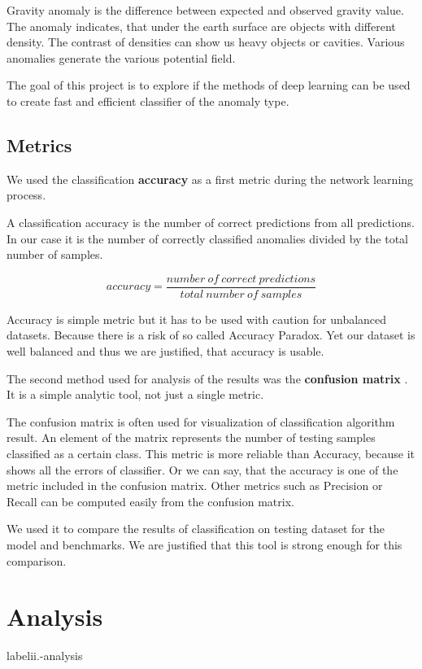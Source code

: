 \documentclass{article}
\begin{document}
Gravity anomaly is the difference between expected and observed gravity
value. The anomaly indicates, that under the earth surface are objects
with different density. The contrast of densities can show us heavy
objects or cavities. Various anomalies generate the various potential
field.

The goal of this project is to explore if the methods of deep learning
can be used to create fast and efficient classifier of the anomaly
type.

\subsection{Metrics}

We used the classification \textbf{accuracy} as a first metric during the network learning process. 

A classification accuracy is the number of correct predictions from all
predictions. In our case it is the number of correctly classified anomalies
divided by the total number of samples.

\begin{equation}
accuracy = \frac{number~of~correct~predictions}{total~number~of~samples}
\end{equation}


Accuracy is simple metric but it has to be used with caution for unbalanced
datasets.  Because there is a risk of so called Accuracy Paradox.  Yet our
dataset is well balanced and thus we are justified, that accuracy is usable.
      

The second method used for analysis of the results was the \textbf{confusion
matrix} \cite{conmat}. It is a simple analytic tool, not just a single metric.

The confusion matrix is often used for visualization of classification algorithm
result. An element of the matrix represents the number of testing samples
classified as a certain class. This metric is  more reliable than Accuracy,
because it shows all the errors of classifier. Or we can say, that the accuracy
is one of the metric included in the confusion matrix. Other metrics such as
Precision or Recall can be computed easily from the confusion matrix.

We used it to compare the results of classification on testing dataset for the
model and benchmarks. We are justified that this tool is strong enough for this
comparison.

\section{Analysis}label{ii.-analysis}
\end{document}
